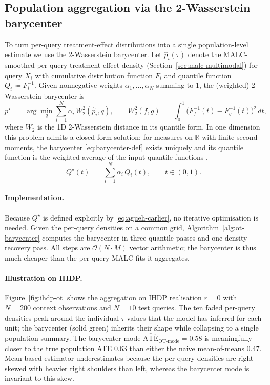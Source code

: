 \documentclass[11pt]{article}
\theoremstyle{plain}
\theoremstyle{definition}
\theoremstyle{remark}
\begin{document}
\subsection{Population aggregation via the 2-Wasserstein barycenter}
\label{sec:ot-barycenter}
To turn per-query treatment-effect distributions into a single
population-level estimate we use the 2-Wasserstein barycenter.
Let $\hat{p}_i(\tau)$ denote the MALC-smoothed per-query
treatment-effect density (Section~\ref{sec:malc-multimodal}) for
query $X_i$ with cumulative distribution function $F_i$ and quantile
function $Q_i \coloneqq F_i^{-1}$. Given nonnegative weights
$\alpha_1, \dots, \alpha_N$ summing to $1$, the (weighted)
2-Wasserstein barycenter is
\begin{equation}
  p^{\star}
  \;=\;
  \arg\!\min_{q}
  \sum_{i=1}^{N} \alpha_i\, W_2^{2}(\hat{p}_i, q),
  \qquad
  W_2^{2}(f, g)
  \;=\;
  \int_{0}^{1}\!\!\bigl(F_f^{-1}(t) - F_g^{-1}(t)\bigr)^{2}\,dt,
  \label{eq:barycenter-def}
\end{equation}
where $W_2$ is the 1D 2-Wasserstein distance in its quantile form.
In one dimension this problem admits a closed-form solution: for
measures on $\mathbb{R}$ with finite second moments, the barycenter
\eqref{eq:barycenter-def} exists uniquely and its quantile function is
the weighted average of the input quantile functions
\citep{aguehcarlier2011barycenters},
\begin{equation}
  Q^{\star}(t)
  \;=\;
  \sum_{i=1}^{N} \alpha_i\, Q_i(t),
  \qquad
  t \in (0, 1).
  \label{eq:agueh-carlier}
\end{equation}
\paragraph{Implementation.}
Because $Q^{\star}$ is defined explicitly by \eqref{eq:agueh-carlier},
no iterative optimisation is needed. Given the per-query densities on a
common grid, Algorithm~\ref{alg:ot-barycenter} computes the barycenter
in three quantile passes and one density-recovery pass. All steps are
$\mathcal{O}(N \!\cdot\! M)$ vector arithmetic; the barycenter is thus
much cheaper than the per-query MALC fits it aggregates.


\paragraph{Illustration on IHDP.}
Figure~\ref{fig:ihdp-ot} shows the aggregation on IHDP realisation $r{=}0$
with $N{=}200$ context observations and $N{=}10$ test queries. The ten
faded per-query densities peak around the individual $\tau$ values that
the model has inferred for each unit; the barycenter (solid green)
inherits their shape while collapsing to a single population summary.
The barycenter mode $\widehat{\mathrm{ATE}}_{\mathrm{OT\text{-}mode}} = 0.58$
is meaningfully closer to the true population ATE $0.63$ than either the
naive mean-of-means $0.47$. Mean-based
estimator underestimates because the per-query densities are right-skewed with heavier right shoulders than left, whereas the barycenter mode is invariant to this skew. 
\end{document}
